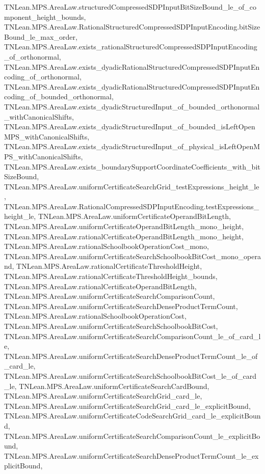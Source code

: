 \begin{lemma}
{        TNLean.MPS.AreaLaw.structuredCompressedSDPInputBitSizeBound_le_of_component_height_bounds,
        TNLean.MPS.AreaLaw.RationalStructuredCompressedSDPInputEncoding.bitSizeBound_le_max_order,
        TNLean.MPS.AreaLaw.exists_rationalStructuredCompressedSDPInputEncoding_of_orthonormal,
        TNLean.MPS.AreaLaw.exists_dyadicRationalStructuredCompressedSDPInputEncoding_of_orthonormal,
        TNLean.MPS.AreaLaw.exists_dyadicRationalStructuredCompressedSDPInputEncoding_of_bounded_orthonormal,
        TNLean.MPS.AreaLaw.exists_dyadicStructuredInput_of_bounded_orthonormal_withCanonicalShifts,
        TNLean.MPS.AreaLaw.exists_dyadicStructuredInput_of_bounded_isLeftOpenMPS_withCanonicalShifts,
        TNLean.MPS.AreaLaw.exists_dyadicStructuredInput_of_physical_isLeftOpenMPS_withCanonicalShifts,
        TNLean.MPS.AreaLaw.exists_boundarySupportCoordinateCoefficients_with_bitSizeBound,
        TNLean.MPS.AreaLaw.uniformCertificateSearchGrid_testExpressions_height_le,
        TNLean.MPS.AreaLaw.RationalCompressedSDPInputEncoding.testExpressions_height_le,
        TNLean.MPS.AreaLaw.uniformCertificateOperandBitLength,
        TNLean.MPS.AreaLaw.uniformCertificateOperandBitLength_mono_height,
        TNLean.MPS.AreaLaw.rationalCertificateOperandBitLength_mono_height,
        TNLean.MPS.AreaLaw.rationalSchoolbookOperationCost_mono,
        TNLean.MPS.AreaLaw.uniformCertificateSearchSchoolbookBitCost_mono_operand,
        TNLean.MPS.AreaLaw.rationalCertificateThresholdHeight,
        TNLean.MPS.AreaLaw.rationalCertificateThresholdHeight_bounds,
        TNLean.MPS.AreaLaw.rationalCertificateOperandBitLength,
        TNLean.MPS.AreaLaw.uniformCertificateSearchComparisonCount,
        TNLean.MPS.AreaLaw.uniformCertificateSearchDenseProductTermCount,
        TNLean.MPS.AreaLaw.rationalSchoolbookOperationCost,
        TNLean.MPS.AreaLaw.uniformCertificateSearchSchoolbookBitCost,
        TNLean.MPS.AreaLaw.uniformCertificateSearchComparisonCount_le_of_card_le,
        TNLean.MPS.AreaLaw.uniformCertificateSearchDenseProductTermCount_le_of_card_le,
        TNLean.MPS.AreaLaw.uniformCertificateSearchSchoolbookBitCost_le_of_card_le,
        TNLean.MPS.AreaLaw.uniformCertificateSearchCardBound,
        TNLean.MPS.AreaLaw.uniformCertificateSearchGrid_card_le,
        TNLean.MPS.AreaLaw.uniformCertificateSearchGrid_card_le_explicitBound,
        TNLean.MPS.AreaLaw.uniformCertificateCodeSearchGrid_card_le_explicitBound,
        TNLean.MPS.AreaLaw.uniformCertificateSearchComparisonCount_le_explicitBound,
        TNLean.MPS.AreaLaw.uniformCertificateSearchDenseProductTermCount_le_explicitBound,
}
\end{lemma}
